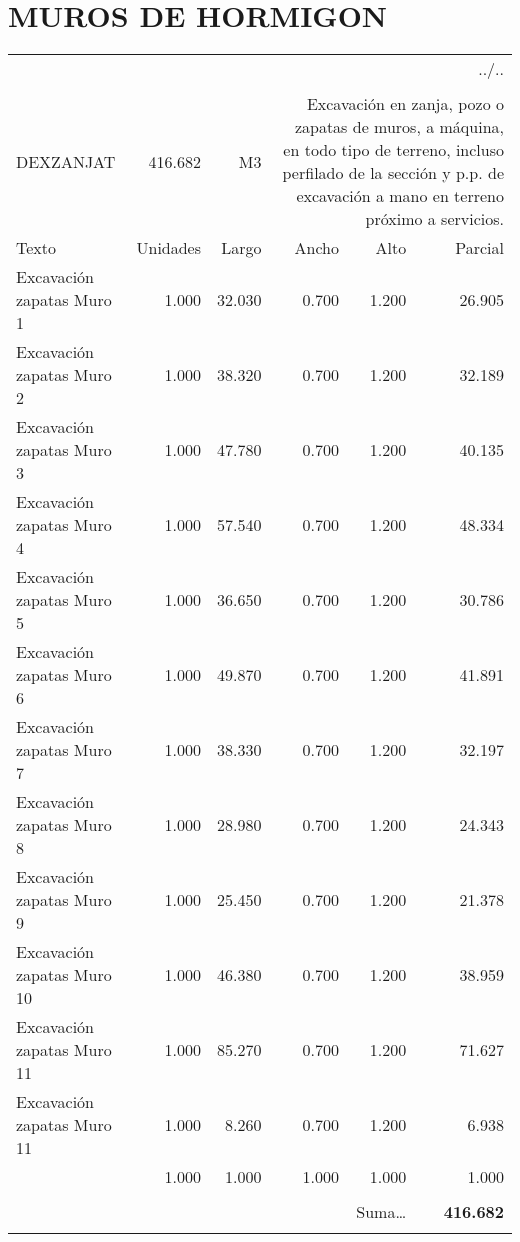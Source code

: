 \documentclass{book}%
\begin{document}
\section{MUROS DE HORMIGON}%
\label{sec:MUROSDEHORMIGON}%
\begin{longtable}{lrrrrr}%
\multicolumn{6}{r}{../..}\\%
\endfoot%
\endlastfoot%
&&&&&\\%
DEXZANJAT&416.682& M3&\multicolumn{3}{p{6cm}}{\scriptsize Excavación en zanja, pozo o zapatas de muros, a máquina, en todo tipo de terreno, incluso perfilado de la sección y p.p. de excavación a mano en terreno próximo a servicios.\normalsize}\\%
Texto&Unidades&Largo&Ancho&Alto&Parcial\\%
\hline%
\multicolumn{1}{p{3.5cm}}{Excavación zapatas Muro 1}&1.000&32.030&0.700&1.200&26.905\\%
\multicolumn{1}{p{3.5cm}}{Excavación zapatas Muro 2}&1.000&38.320&0.700&1.200&32.189\\%
\multicolumn{1}{p{3.5cm}}{Excavación zapatas Muro 3 }&1.000&47.780&0.700&1.200&40.135\\%
\multicolumn{1}{p{3.5cm}}{Excavación zapatas Muro 4}&1.000&57.540&0.700&1.200&48.334\\%
\multicolumn{1}{p{3.5cm}}{Excavación zapatas Muro 5}&1.000&36.650&0.700&1.200&30.786\\%
\multicolumn{1}{p{3.5cm}}{Excavación zapatas Muro 6}&1.000&49.870&0.700&1.200&41.891\\%
\multicolumn{1}{p{3.5cm}}{Excavación zapatas Muro 7}&1.000&38.330&0.700&1.200&32.197\\%
\multicolumn{1}{p{3.5cm}}{Excavación zapatas Muro 8}&1.000&28.980&0.700&1.200&24.343\\%
\multicolumn{1}{p{3.5cm}}{Excavación zapatas Muro 9 }&1.000&25.450&0.700&1.200&21.378\\%
\multicolumn{1}{p{3.5cm}}{Excavación zapatas Muro 10}&1.000&46.380&0.700&1.200&38.959\\%
\multicolumn{1}{p{3.5cm}}{Excavación zapatas Muro 11}&1.000&85.270&0.700&1.200&71.627\\%
\multicolumn{1}{p{3.5cm}}{Excavación zapatas Muro 11}&1.000&8.260&0.700&1.200&6.938\\%
\multicolumn{1}{p{3.5cm}}{}&1.000&1.000&1.000&1.000&1.000\\%
&&&&&\\%
\multicolumn{5}{r}{Suma\ldots}&\textbf{416.682}\\%
\hline%
&&&&&\\%

\end{longtable}
\end{document}
